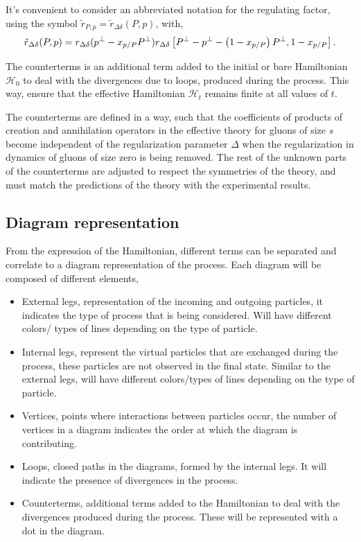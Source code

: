 \documentclass[11pt,a4paper,twoside,pdf]{article}
\numberwithin{equation}{section}
\begin{document}
It's convenient to consider an abbreviated notation for the regulating factor, 
using the symbol $\tilde{r}_{P, p} = \tilde{r}_{\Delta \delta} (P,p)$, with,
\begin{equation}
    \tilde{r}_{\Delta \delta} (P,p) = r_{\Delta \delta} (p^\perp - x_{p/P}P^\perp) 
    r_{\Delta \delta}\left[ P^\perp-p^\perp-\left( 1-x_{p/P} \right)P^\perp, 1-x_{p/P} \right].
\end{equation}

The counterterms is an additional term added to the initial or bare Hamiltonian 
$\mathcal{H}_0$ to deal with the divergences due to loops, produced during the 
process. This way, ensure that the effective Hamiltonian $\mathcal{H}_t$ remains 
finite at all values of $t$.

The counterterms are defined in a way, such that the coefficients of products 
of creation and annihilation operators in the effective theory for gluons of size $s$
become independent of the regularization parameter $\Delta$ when the regularization
in dynamics of gluons of size zero is being removed. The rest of the unknown parts 
of the counterterms are adjusted to respect the symmetries of the theory, and must 
match the predictions of the theory with the experimental results.

\subsection{Diagram representation}

From the expression of the Hamiltonian, different terms can be separated and correlate
to a diagram representation of the process. Each diagram will be composed of different elements, 

\begin{itemize}
    \item External legs, representation of the incoming and outgoing particles, it 
    indicates the type of process that is being considered. Will have different colors/
    types of lines depending on the type of particle.
    \item Internal legs, represent the virtual particles that are exchanged during the
    process, these particles are not observed in the final state. Similar to the
    external legs, will have different colors/types of lines depending on the type of
    particle.
    \item Vertices, points where interactions between particles occur, the number of
    vertices in a diagram indicates the order at which the diagram is contributing.
    \item Loops, closed paths in the diagrams, formed by the internal legs. It will
    indicate the presence of divergences in the process.
    \item Counterterms, additional terms added to the Hamiltonian to deal with the divergences
    produced during the process. These will be represented with a dot in the diagram.
\end{itemize}
\end{document}
